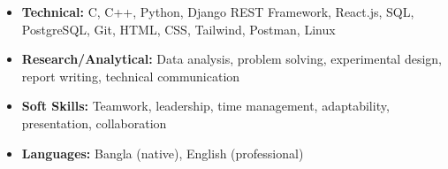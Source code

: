 \begin{itemize}
  \item \textbf{Technical:} C, C++, Python, Django REST Framework, React.js, SQL, PostgreSQL, Git, HTML, CSS, Tailwind, Postman, Linux
  \item \textbf{Research/Analytical:} Data analysis, problem solving, experimental design, report writing, technical communication
  \item \textbf{Soft Skills:} Teamwork, leadership, time management, adaptability, presentation, collaboration
  \item \textbf{Languages:} Bangla (native), English (professional)
\end{itemize}
